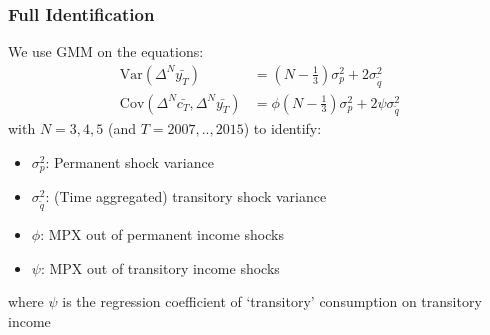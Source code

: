 \documentclass{beamer}
\begin{document}

\frame
{
	\frametitle{Full Identification}
We use GMM on the equations:
\begin{align*}
\mathrm{Var}(\Delta^N \bar{y_T} ) &=  (N-\frac{1}{3}) \sigma^2_p + 2  \sigma^2_{\tilde{q}} \\
\mathrm{Cov}(\Delta^N \bar{c_T},\Delta^N \bar{y_T} ) &= \phi (N-\frac{1}{3}) \sigma^2_p + 2 \psi \sigma^2_{\tilde{q}}
\end{align*}
with $N=3,4,5$ (and $T=2007,..,2015$) to identify:\\
\bigskip
\begin{itemize}
	\item $\sigma^2_p$: Permanent shock variance
	\item $\sigma^2_{\tilde{q}}$: (Time aggregated) transitory shock variance
	\item $\phi$: MPX out of permanent income shocks
	\item $\psi$: MPX out of transitory income shocks
\end{itemize}
\bigskip
where  $\psi$ is the regression coefficient of `transitory' consumption on transitory income
\hyperlink{whynotbpp}{}
}
\end{document}
